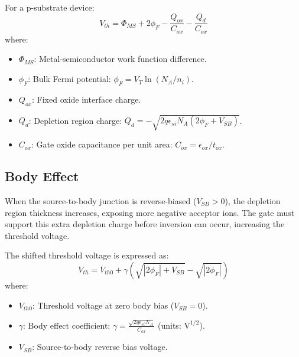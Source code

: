 \documentclass[12pt,a4paper]{article}
\begin{document}
\begin{tcolorbox}[formulabox, title={\textbf{Threshold Voltage Formula}}]
For a p-substrate device:
\begin{equation}
  V_{th} = \Phi_{MS} + 2\phi_F - \frac{Q_{ox}}{C_{ox}} - \frac{Q_d}{C_{ox}}
\end{equation}
where:
\begin{itemize}[leftmargin=*, itemsep=2pt, topsep=2pt]
  \item $\Phi_{MS}$: Metal-semiconductor work function difference.
  \item $\phi_F$: Bulk Fermi potential: $\phi_F = V_T \ln(N_A / n_i)$.
  \item $Q_{ox}$: Fixed oxide interface charge.
  \item $Q_d$: Depletion region charge: $Q_d = -\sqrt{2q\epsilon_{si}N_A(2\phi_F + V_{SB})}$.
  \item $C_{ox}$: Gate oxide capacitance per unit area: $C_{ox} = \epsilon_{ox}/t_{ox}$.
\end{itemize}
\end{tcolorbox}

\subsection{Body Effect}
When the source-to-body junction is reverse-biased ($V_{SB} > 0$), the depletion region thickness increases, exposing more negative acceptor ions. The gate must support this extra depletion charge before inversion can occur, increasing the threshold voltage.

\begin{tcolorbox}[formulabox, title={\textbf{Body Effect Expression}}]
The shifted threshold voltage is expressed as:
\begin{equation}
  V_{th} = V_{th0} + \gamma \left( \sqrt{|2\phi_F| + V_{SB}} - \sqrt{|2\phi_F|} \right)
\end{equation}
where:
\begin{itemize}[leftmargin=*, itemsep=2pt, topsep=2pt]
  \item $V_{th0}$: Threshold voltage at zero body bias ($V_{SB} = 0$).
  \item $\gamma$: Body effect coefficient: $\gamma = \frac{\sqrt{2q\epsilon_{si}N_A}}{C_{ox}}$ (units: $\text{V}^{1/2}$).
  \item $V_{SB}$: Source-to-body reverse bias voltage.
\end{itemize}
\end{tcolorbox}
\end{document}
